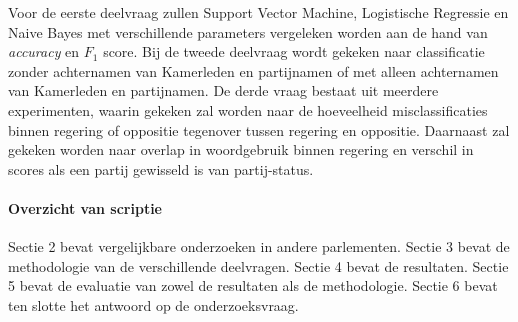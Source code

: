 Voor de eerste deelvraag zullen Support Vector Machine, Logistische Regressie en Naive Bayes met verschillende parameters vergeleken worden aan de hand van \textit{accuracy} en $F_1$ score. Bij de tweede deelvraag wordt gekeken naar classificatie zonder achternamen van Kamerleden en partijnamen of met alleen achternamen van Kamerleden en partijnamen. De derde vraag bestaat uit meerdere experimenten, waarin gekeken zal worden naar de hoeveelheid misclassificaties binnen regering of oppositie tegenover tussen regering en oppositie. Daarnaast zal gekeken worden naar overlap in woordgebruik binnen regering en verschil in scores als een partij gewisseld is van partij-status.


\paragraph{Overzicht van scriptie}
Sectie 2 bevat vergelijkbare onderzoeken in andere parlementen. Sectie 3 bevat de methodologie van de verschillende deelvragen. Sectie 4 bevat de resultaten. Sectie 5 bevat de evaluatie van zowel de resultaten als de methodologie. Sectie 6 bevat ten slotte het antwoord op de onderzoeksvraag.
